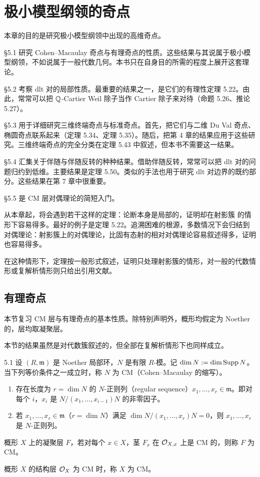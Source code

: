\chapter{极小模型纲领的奇点}

本章的目的是研究极小模型纲领中出现的高维奇点。

§5.1 研究 Cohen--Macaulay 奇点与有理奇点的性质。这些结果与其说属于极小模型纲领，不如说属于一般代数几何。本书只在自身目的所需的程度上展开这套理论。

§5.2 考察 dlt 对的局部性质。最重要的结果之一，是它们的有理性定理 5.22。由此，常常可以把 $\mathbb{Q}$-Cartier Weil 除子当作 Cartier 除子来对待（命题 5.26、推论 5.27）。

§5.3 用于详细研究三维终端奇点与标准奇点。首先，把它们与二维 Du Val 奇点、椭圆奇点联系起来（定理 5.34、定理 5.35）。随后，把第 4 章的结果应用于这些研究。三维终端奇点的完全分类在定理 5.43 中叙述，但本书不需要这一结果。

§5.4 汇集关于伴随与伴随反转的种种结果。借助伴随反转，常常可以把 dlt 对的问题归约到低维。主要结果是定理 5.50。类似的手法也用于研究 dlt 对边界的既约部分。这些结果在第 7 章中很重要。

§5.5 是 CM 层对偶理论的简短入门。

从本章起，将会遇到若干这样的定理：论断本身是局部的，证明却在射影簇
的情形下容易得多。最好的例子是定理 5.22。追溯困难的根源，多数情况下会归结到对偶理论：射影簇上的对偶理论，比固有态射的相对对偶理论容易叙述得多，证明也容易得多。

在这种情形下，定理按一般形式叙述，证明只处理射影簇的情形，对一般的代数情形或复解析情形则只给出引用文献。

\section{有理奇点}

本节复习 CM 层与有理奇点的基本性质。除特别声明外，概形均假定为 Noether 的，层均取凝聚层。

本节的结果虽然是对代数簇叙述的，但全部在复解析情形下也同样成立。

\begin{definition}{5.1}
设 $(R,\mathfrak{m})$ 是 Noether 局部环，$N$ 是有限 $R$-模。记 $\dim N:=\dim\operatorname{Supp} N$。当下列等价条件之一成立时，称 $N$ 为 CM（Cohen--Macaulay 的缩写）。
\begin{enumerate}[label=(\arabic*),leftmargin=*]
\item 存在长度为 $r=\dim N$ 的 $N$-正则列（regular sequence）$x_1,\dots,x_r\in\mathfrak{m}$。即对每个 $i$，$x_i$ 是 $N/(x_1,\dots,x_{i-1})N$ 的非零因子。
\item 若 $x_1,\dots,x_r\in\mathfrak{m}$（$r=\dim N$）满足 $\dim N/(x_1,\dots,x_r)N=0$，则 $x_1,\dots,x_r$ 是 $N$-正则列。
\end{enumerate}
概形 $X$ 上的凝聚层 $F$，若对每个 $x\in X$，茎 $F_x$ 在 $\mathcal{O}_{X,x}$ 上是 CM 的，则称 $F$ 为 CM。

概形 $X$ 的结构层 $\mathcal{O}_X$ 为 CM 时，称 $X$ 为 CM。
\end{definition}

